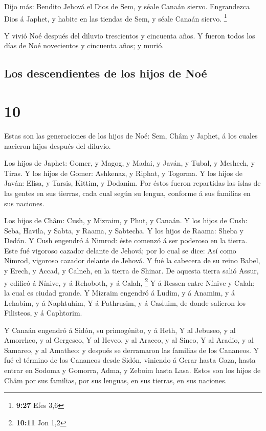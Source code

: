  Dijo más: Bendito Jehová el Dios de Sem, y séale Canaán
siervo.  Engrandezca Dios á Japhet, y habite en las tiendas
de Sem, y séale Canaán siervo. \footnote{\textbf{9:27} Efes 3,6}

 Y vivió Noé después del diluvio trescientos y cincuenta
años.  Y fueron todos los días de Noé novecientos y
cincuenta años; y murió.

\hypertarget{los-descendientes-de-los-hijos-de-nouxe9}{%
\subsection{Los descendientes de los hijos de
Noé}\label{los-descendientes-de-los-hijos-de-nouxe9}}

\hypertarget{section-9}{%
\section{10}\label{section-9}}

 Estas son las generaciones de los hijos de Noé: Sem, Châm y
Japhet, á los cuales nacieron hijos después del diluvio.

 Los hijos de Japhet: Gomer, y Magog, y Madai, y Javán, y
Tubal, y Meshech, y Tiras.  Y los hijos de Gomer: Ashkenaz,
y Riphat, y Togorma.  Y los hijos de Javán: Elisa, y Tarsis,
Kittim, y Dodanim.  Por éstos fueron repartidas las islas de
las gentes en sus tierras, cada cual según su lengua, conforme á sus
familias en sus naciones.

 Los hijos de Châm: Cush, y Mizraim, y Phut, y Canaán.
 Y los hijos de Cush: Seba, Havila, y Sabta, y Raama, y
Sabtecha. Y los hijos de Raama: Sheba y Dedán.  Y Cush
engendró á Nimrod: éste comenzó á ser poderoso en la tierra.
 Este fué vigoroso cazador delante de Jehová; por lo cual se
dice: Así como Nimrod, vigoroso cazador delante de Jehová. 
Y fué la cabecera de su reino Babel, y Erech, y Accad, y Calneh, en la
tierra de Shinar.  De aquesta tierra salió Assur, y edificó
á Nínive, y á Rehoboth, y á Calah, \footnote{\textbf{10:11} Jon 1,2}
 Y á Ressen entre Nínive y Calah; la cual es ciudad grande.
 Y Mizraim engendró á Ludim, y á Anamim, y á Lehabim, y á
Naphtuhim,  Y á Pathrusim, y á Casluim, de donde salieron
los Filisteos, y á Caphtorim.

 Y Canaán engendró á Sidón, su primogénito, y á Heth,
 Y al Jebuseo, y al Amorrheo, y al Gergeseo, 
Y al Heveo, y al Araceo, y al Sineo,  Y al Aradio, y al
Samareo, y al Amatheo: y después se derramaron las familias de los
Cananeos.  Y fué el término de los Cananeos desde Sidón,
viniendo á Gerar hasta Gaza, hasta entrar en Sodoma y Gomorra, Adma, y
Zeboim hasta Lasa.  Estos son los hijos de Châm por sus
familias, por sus lenguas, en sus tierras, en sus naciones.

